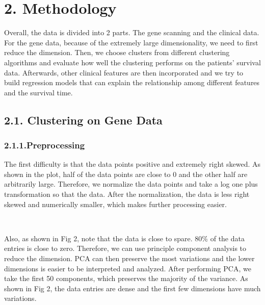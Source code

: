 \documentclass[11pt]{article}
\begin{document}
    \hypertarget{methodology}{%
\section{2. Methodology}\label{methodology}}

Overall, the data is divided into 2 parts. The gene scanning and the
clinical data. For the gene data, because of the extremely large
dimensionality, we need to first reduce the dimension. Then, we choose
clusters from different clustering algorithms and evaluate how well the
clustering performs on the patients' survival data. Afterwards, other
clinical features are then incorporated and we try to build regression
models that can explain the relationship among different features and
the survival time.

    \hypertarget{clustering-on-gene-data}{%
\subsection{2.1. Clustering on Gene
Data}\label{clustering-on-gene-data}}

\hypertarget{preprocessing}{%
\subsubsection{2.1.1.Preprocessing}\label{preprocessing}}

The first difficulty is that the data points positive and extremely
right skewed. As shown in the plot, half of the data points are close to
0 and the other half are arbitrarily large. Therefore, we normalize the
data points and take a log one plus transformation so that the data.
After the normalization, the data is less right skewed and numerically
smaller, which makes further processing easier.


    \begin{center}
    \end{center}
    { \hspace*{\fill} \\}
    
    Also, as shown in Fig 2, note that the data is close to spare. 80\% of
the data entries is close to zero. Therefore, we can use principle
component analysis to reduce the dimension. PCA can then preserve the
most variations and the lower dimensions is easier to be interpreted and
analyzed. After performing PCA, we take the first 50 components, which
preserves the majority of the variance. As shown in Fig 2, the data
entries are dense and the first few dimensions have much variations.
\end{document}
